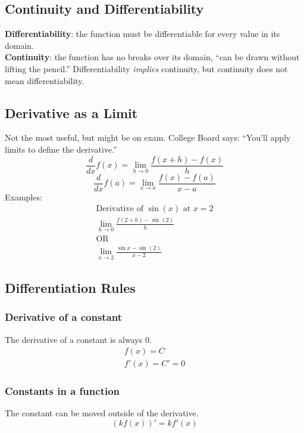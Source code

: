 \documentclass[12pt]{article}
\begin{document}
        \subsection{Continuity and Differentiability}
            \textbf{Differentiability}: the function must be differentiable for every value in its domain.
            \\ \textbf{Continuity}: the function has no breaks over its domain, ``can be drawn without lifting the pencil.''
            \newline
            Differentiability \textit{implies} continuity, but continuity does not mean differentiability.

        \subsection{Derivative as a Limit}
            Not the most useful, but might be on exam. College Board says: ``You'll apply limits to define the derivative.''
            \[ \frac{d}{dx} f(x) = \lim_{h \to 0} \frac{f(x+h) - f(x)}{h} \]
            \[ \frac{d}{dx} f(a) = \lim_{x \to a} \frac{f(x) - f(a)}{x-a} \]
            \newline
            Examples:
            \begin{gather*}
                \text{Derivative of $\sin(x)$ at $x=2$} \\
                \lim_{h \to 0} \frac{f(2+h) - \sin{(2)}}{h} \\
                \text{OR} \\
                \lim_{x \to 2} \frac{\sin{x} - \sin{(2)}}{x-2}
            \end{gather*}

        \subsection{Differentiation Rules}
            \subsubsection{Derivative of a constant}
                The derivative of a constant is always $0$.
                \begin{gather*}
                    f(x) = C \\
                    f'(x) = C' = 0
                \end{gather*}

            \subsubsection{Constants in a function}
                The constant can be moved outside of the derivative.
                \[ \left( k f(x) \right)' = k f'(x) \]
\end{document}

